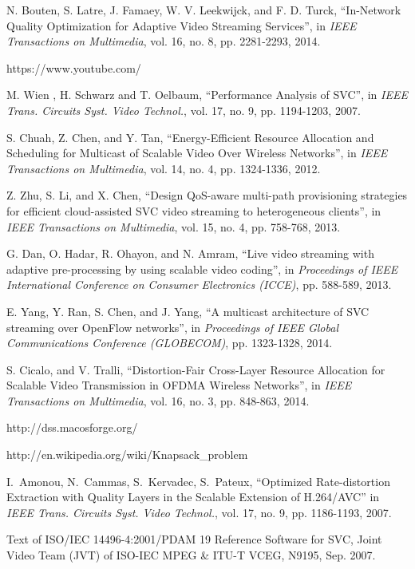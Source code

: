 \documentclass[journal]{IEEEtran}
\begin{document}
\begin{thebibliography}{1}
N. Bouten, S. Latre, J. Famaey, W. V. Leekwijck, and F. D. Turck, ``In-Network Quality Optimization for Adaptive Video Streaming Services'', in {\em IEEE Transactions on Multimedia}, vol. 16, no. 8, pp. 2281-2293, 2014.

https://www.youtube.com/

M. Wien , H. Schwarz and T. Oelbaum,  ``Performance Analysis of SVC'',  in {\em IEEE Trans. Circuits Syst. Video Technol.}, vol. 17, no. 9, pp. 1194-1203, 2007.

S. Chuah, Z. Chen, and Y. Tan, ``Energy-Efficient Resource Allocation and Scheduling for Multicast of Scalable Video Over Wireless Networks'', in {\em IEEE Transactions on Multimedia}, vol. 14, no. 4, pp. 1324-1336, 2012.

Z. Zhu, S. Li, and X. Chen, ``Design QoS-aware multi-path provisioning strategies for efficient cloud-assisted SVC video streaming to heterogeneous clients'', in {\em IEEE Transactions on Multimedia}, vol. 15, no. 4, pp. 758-768, 2013.

G. Dan, O. Hadar, R. Ohayon, and N. Amram, ``Live video streaming with adaptive pre-processing by using scalable video coding'', in {\em Proceedings of IEEE International Conference on Consumer Electronics (ICCE)}, pp. 588-589, 2013.

E. Yang, Y. Ran, S. Chen, and J. Yang, ``A multicast architecture of SVC streaming over OpenFlow networks'', in {\em Proceedings of IEEE Global Communications Conference (GLOBECOM)}, pp. 1323-1328, 2014.

S. Cicalo, and V. Tralli, ``Distortion-Fair Cross-Layer Resource Allocation for Scalable Video Transmission in OFDMA Wireless Networks'', in {\em IEEE Transactions on Multimedia}, vol. 16, no. 3, pp. 848-863, 2014.

http://dss.macosforge.org/

http://en.wikipedia.org/wiki/Knapsack\_problem

I.~Amonou, N.~Cammas, S.~Kervadec, S.~Pateux, ``Optimized Rate-distortion Extraction with Quality Layers in the Scalable Extension of H.264/AVC'' in {\em IEEE Trans. Circuits Syst. Video Technol.}, vol. 17, no. 9, pp. 1186-1193, 2007.

Text of ISO/IEC 14496-4:2001/PDAM 19 Reference Software for SVC, Joint Video Team (JVT) of ISO-IEC MPEG \& ITU-T VCEG, N9195, Sep. 2007.


\end{thebibliography}
\end{document}
